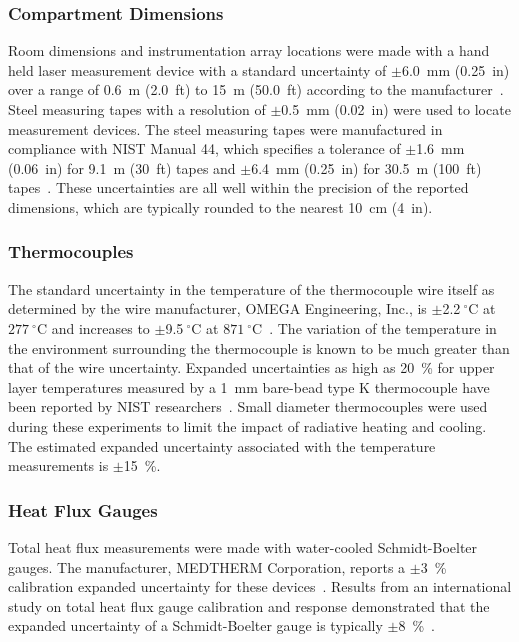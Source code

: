 \documentclass[12pt,oneside]{book}
\begin{document}
\subsubsection{Compartment Dimensions}
Room dimensions and instrumentation array locations were made with a hand held laser measurement device with a standard uncertainty of $\pm$6.0~mm (0.25~in) over a range of 0.6~m (2.0~ft) to 15~m (50.0~ft) according to the manufacturer~\cite{StanleyTools}. Steel measuring tapes with a resolution of $\pm$0.5~mm (0.02~in) were used to locate measurement devices. The steel measuring tapes were manufactured in compliance with NIST Manual 44, which specifies a tolerance of $\pm$1.6~mm (0.06~in) for 9.1~m (30~ft) tapes and $\pm$6.4~mm (0.25~in) for 30.5~m (100~ft) tapes~\cite{Butcher:2012}. These uncertainties are all well within the precision of the reported dimensions, which are typically rounded to the nearest 10~cm (4~in).

\subsubsection{Thermocouples}
The standard uncertainty in the temperature of the thermocouple wire itself as determined by the wire manufacturer, OMEGA Engineering, Inc., is $\pm$2.2$~^{\circ}$C at $277~^{\circ}$C and increases to $\pm$9.5$~^{\circ}$C at $871~^{\circ}$C~\cite{Omega:2004}. The variation of the temperature in the environment surrounding the thermocouple is known to be much greater than that of the wire uncertainty. Expanded uncertainties as high as 20~\% for upper layer temperatures measured by a 1~mm bare-bead type K thermocouple have been reported by NIST researchers~\cite{Blevins:1999,Pitts:2003}. Small diameter thermocouples were used during these experiments to limit the impact of radiative heating and cooling. The estimated expanded uncertainty associated with the temperature measurements is $\pm$15~\%.

\subsubsection{Heat Flux Gauges}
Total heat flux measurements were made with water-cooled Schmidt-Boelter gauges. The manufacturer, MEDTHERM Corporation, reports a $\pm$3~\% calibration expanded uncertainty for these devices~\cite{Medtherm:2003}. Results from an international study on total heat flux gauge calibration and response demonstrated that the expanded uncertainty of a Schmidt-Boelter gauge is typically $\pm$8~\%~\cite{Pitts:2006}.
\end{document}
